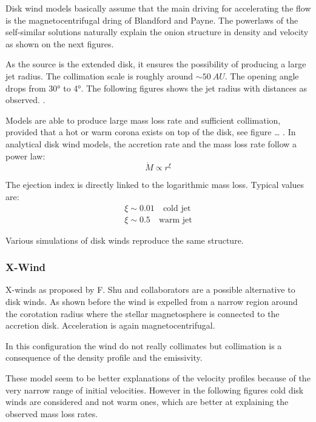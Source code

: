 \documentclass[10pt,a4paper,english]{article}
\begin{document}
Disk wind models basically assume that the main driving for accelerating the
flow is the magnetocentrifugal dring of Blandford and Payne. The powerlaws of
the self-similar solutions naturally explain the onion structure in density and
velocity as shown on the next figures.


As the source is the extended disk, it ensures the possibility of producing a
large jet radius. The collimation scale is roughly around $\sim \SI{50}{AU}$.
The opening angle drops from \ang{30} to \ang{4}. The following figures shows
the jet radius with distances as observed. .

Models are able to produce large mass loss rate and sufficient collimation,
provided that a hot or warm corona exists on top of the disk, see figure …
. In analytical disk wind models, the accretion rate and the
mass loss rate follow a power law:
\begin{equation}
    \dot{M} \propto r^\xi
\end{equation}

The ejection index is directly linked to the logarithmic mass loss. Typical
values are:
\begin{align}
    \xi \sim 0.01 \quad \textrm{cold jet} \\
    \xi \sim 0.5 \quad \textrm{warm jet}
\end{align}

Various simulations of disk winds reproduce the same structure.

\subsubsection{X-Wind}

X-winds as proposed by F. Shu and collaborators are a possible alternative to
disk winds. As shown before the wind is expelled from a narrow region around
the corotation radius where the stellar magnetosphere is connected to the
accretion disk. Acceleration is again magnetocentrifugal.

In this configuration the wind do not really collimates but collimation is a
consequence of the density profile and the emissivity.


These model seem to be better explanations of the velocity profiles because of
the very narrow range of initial velocities. However in the following figures
 cold disk winds are considered and not warm ones,
which are better at explaining the observed mass loss rates.
\end{document}
